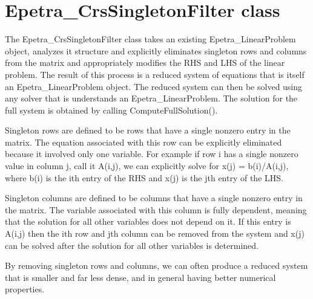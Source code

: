 \section{Epetra\_CrsSingletonFilter class}
 The Epetra\_CrsSingletonFilter class takes an existing Epetra\_LinearProblem object,
analyzes it structure and explicitly eliminates singleton rows and columns from the matrix and
appropriately modifies the RHS and LHS of the linear problem.  The result of this process is a
reduced system of equations that is itself an Epetra\_LinearProblem object.  The reduced system
can then be solved using any solver that is understands an Epetra\_LinearProblem.  The 
solution for the full system is obtained by calling ComputeFullSolution().
    
Singleton rows are defined to be rows that have a single nonzero entry in the matrix.
The equation associated with this row can be explicitly eliminated because it involved
 only one variable.  For example if row i has a single nonzero value in column j, call 
it A(i,j), we can explicitly solve for x(j) = b(i)/A(i,j), where b(i) is the ith entry 
of the RHS and x(j) is the jth entry of the LHS.

Singleton columns are defined to be columns that have a single nonzero entry in the matrix.  The variable associated with this column is fully dependent, meaning that the solution for all other variables does not depend on it.  If this entry is A(i,j) then the ith row and jth column can be removed from the system and x(j) can be solved after the solution for all other variables is determined.

By removing singleton rows and columns, we can often produce a reduced system that is smaller and far less dense, and in general having better numerical properties.

